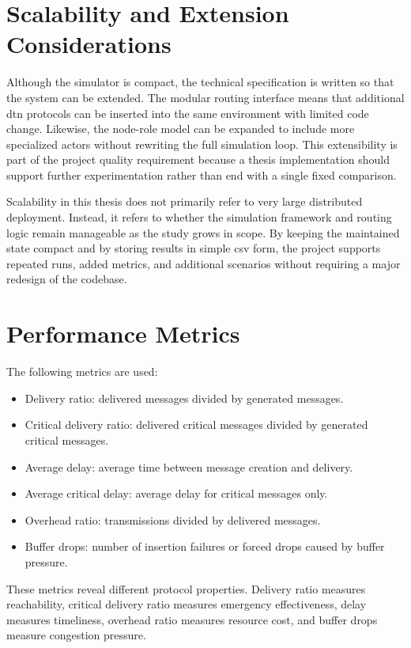 \section{Scalability and Extension Considerations}
Although the simulator is compact, the technical specification is written so that the system can be extended. The modular routing interface means that additional \ac{dtn} protocols can be inserted into the same environment with limited code change. Likewise, the node-role model can be expanded to include more specialized actors without rewriting the full simulation loop. This extensibility is part of the project quality requirement because a thesis implementation should support further experimentation rather than end with a single fixed comparison.

Scalability in this thesis does not primarily refer to very large distributed deployment. Instead, it refers to whether the simulation framework and routing logic remain manageable as the study grows in scope. By keeping the maintained state compact and by storing results in simple \ac{csv} form, the project supports repeated runs, added metrics, and additional scenarios without requiring a major redesign of the codebase.

\section{Performance Metrics}
The following metrics are used:

\begin{itemize}
	\item Delivery ratio: delivered messages divided by generated messages.
	\item Critical delivery ratio: delivered critical messages divided by generated critical messages.
	\item Average delay: average time between message creation and delivery.
	\item Average critical delay: average delay for critical messages only.
	\item Overhead ratio: transmissions divided by delivered messages.
	\item Buffer drops: number of insertion failures or forced drops caused by buffer pressure.
\end{itemize}

These metrics reveal different protocol properties. Delivery ratio measures reachability, critical delivery ratio measures emergency effectiveness, delay measures timeliness, overhead ratio measures resource cost, and buffer drops measure congestion pressure.
